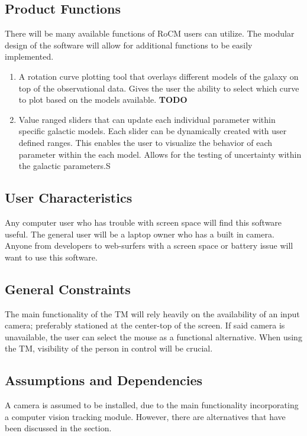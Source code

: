 \documentclass[titlepage]{article}
\begin{document}
\subsection{Product Functions}
There will be many available functions of RoCM users can utilize. The modular design of the software will allow for additional functions to be easily implemented.
\begin{enumerate}
	\item A rotation curve plotting tool that overlays different models of the galaxy on top of the observational data. Gives the user the ability to select which curve to plot based on the models available. \textbf{\LARGE TODO}
	\item Value ranged sliders that can update each individual parameter within specific galactic models. Each slider can be dynamically created with user defined ranges. This enables the user to visualize the behavior of each parameter within the each model. Allows for the testing of uncertainty within the galactic parameters.S
\end{enumerate}


\subsection{User Characteristics}
Any computer user who has trouble with screen space will find this software useful. The general user will be a laptop owner who has a built in camera. Anyone from developers to web-surfers with a screen space or battery issue will want to use this software.

\subsection{General Constraints}
\label{General Constraints}
The main functionality of the TM will rely heavily on the availability of an input camera; preferably stationed at the center-top of the screen. If said camera is unavailable, the user can select the mouse as a functional alternative. When using the TM, visibility of the person in control will be crucial.

\subsection{Assumptions and Dependencies}
A camera is assumed to be installed, due to the main functionality incorporating a computer vision tracking module. However, there are alternatives that have been discussed in the  section.
\end{document}
